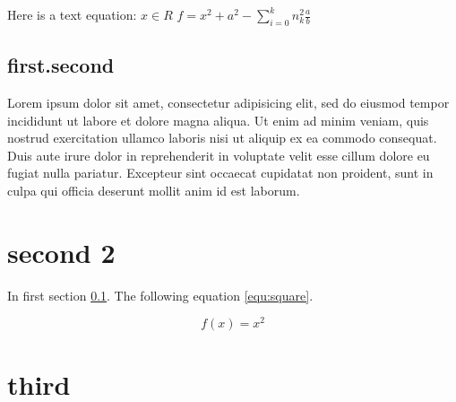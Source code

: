 \documentclass[twocolumn,a4paper,fleqn]{article}
\begin{document}
  Here is a text equation: $x\in R$
  $f = x^2 + a^2 - \sum_{i=0}^k n^2_k \frac{a}{b}$

  \subsection{first.second}
  \label{sub:first-second}
  Lorem ipsum dolor sit amet, consectetur adipisicing elit, sed do eiusmod
  tempor incididunt ut labore et dolore magna aliqua. Ut enim ad minim veniam,
  quis nostrud exercitation ullamco laboris nisi ut aliquip ex ea commodo
  consequat. Duis aute irure dolor in reprehenderit in voluptate velit esse
  cillum dolore eu fugiat nulla pariatur. Excepteur sint occaecat cupidatat non
  proident, sunt in culpa qui officia deserunt mollit anim id est laborum.

  \section{second 2}
  In first section \ref{sub:first-second}.
  The following equation \ref{equ:square}.

  \begin{equation}
    \label{equ:square}
    f(x) = x^2
  \end{equation}

  \section*{third}
\end{document}
